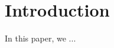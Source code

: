 \documentclass[10pt,sigconf]{acmart}
\begin{document}
\section{Introduction}

%







In this paper, we ...




\end{document}
